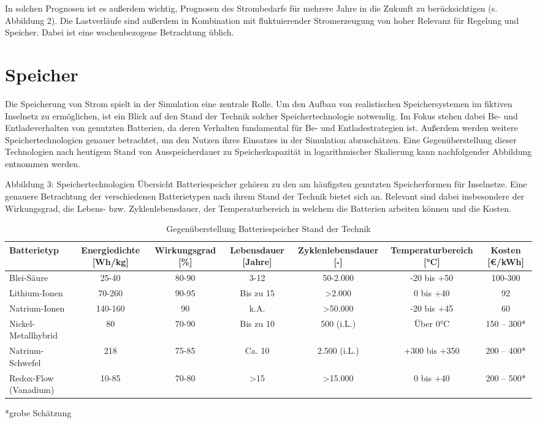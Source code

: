 
In solchen Prognosen ist es außerdem wichtig, Prognosen des Strombedarfs für mehrere Jahre in die Zukunft zu berücksichtigen (s. Abbildung 2). Die Lastverläufe sind außerdem in Kombination mit fluktuierender Stromerzeugung von hoher Relevanz für Regelung und Speicher. Dabei ist eine wochenbezogene Betrachtung üblich.

\section{Speicher}

Die Speicherung von Strom spielt in der Simulation eine zentrale Rolle. Um den Aufbau von realistischen Speichersystemen im fiktiven Inselnetz zu ermöglichen, ist ein Blick auf den Stand der Technik solcher Speichertechnologie notwendig. Im Fokus stehen dabei Be- und Entladeverhalten von genutzten Batterien, da deren Verhalten fundamental für Be- und Entladestrategien ist. Außerdem werden weitere Speichertechnologien genauer betrachtet, um den Nutzen ihres Einsatzes in der Simulation abzuschätzen. Eine Gegenüberstellung dieser Technologien nach heutigem Stand von Ausspeicherdauer zu Speicherkapazität in logarithmischer Skalierung kann nachfolgender Abbildung entnommen werden.
 
Abbildung 3: Speichertechnologien Übersicht
Batteriespeicher gehören zu den am häufigsten genutzten Speicherformen für Inselnetze. Eine genauere Betrachtung der verschiedenen Batterietypen nach ihrem Stand der Technik bietet sich an. Relevant sind dabei insbesondere der Wirkungsgrad, die Lebens- bzw. Zyklenlebensdauer, der Temperaturbereich in welchem die Batterien arbeiten können und die Kosten.

\begin{table}[htbp]
    \centering
    \caption{Gegenüberstellung Batteriespeicher Stand der Technik}
    \label{tab:Gegenüberstellung_Batteriespeicher_Stand_der_Technik}
    \begin{tabular}{lcccccc}
        \toprule
        \textbf{Batterietyp} & \textbf{Energiedichte [Wh/kg]} & \textbf{Wirkungsgrad [\%]} & \textbf{Lebensdauer [Jahre]} & \textbf{Zyklenlebensdauer [-]} & \textbf{Temperaturbereich [°C]} & \textbf{Kosten [€/kWh]} \\
        \midrule
        Blei-Säure & 25-40 & 80-90 & 3-12 & 50-2.000 & -20 bis +50 & 100-300 \\
        Lithium-Ionen & 70-260 & 90-95 & Bis zu 15 & >2.000 & 0 bis +40 & 92 \\
        Natrium-Ionen & 140-160 & 90 & k.A. & >50.000 & -20 bis +45 & 60 \\
        Nickel-Metallhybrid & 80 & 70-90 & Bis zu 10 & 500 (i.L.) & Über 0°C & 150 – 300* \\
        Natrium-Schwefel & 218 & 75-85 & Ca. 10 & 2.500 (i.L.) & +300 bis +350 & 200 – 400* \\
        Redox-Flow (Vanadium) & 10-85 & 70-80 & >15 & >15.000 & 0 bis +40 & 200 – 500* \\
        \bottomrule
    \end{tabular}
\end{table}
*grobe Schätzung

